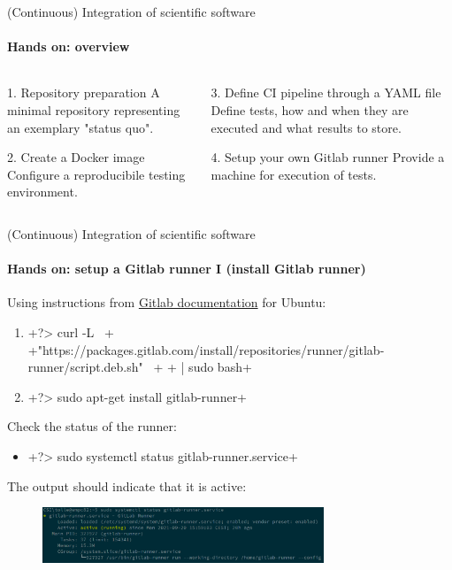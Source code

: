 \begin{frame}{(Continuous) Integration of scientific software}
    \framesubtitle{Hands on: overview}
    \begin{columns}
    \begin{column}{0.48\textwidth}
        \begin{block}{1. Repository preparation}
            A minimal repository representing an exemplary
            "status quo".
        \end{block}
        \begin{block}{2. Create a Docker image}
            Configure a reproducibile testing environment.
        \end{block}
    \end{column}

    \begin{column}{0.48\textwidth}
        \begin{block}{3. Define CI pipeline through a YAML file}
            Define tests, how and when they are executed and what
            results to store.
        \end{block}
        \begin{exampleblock}{4. Setup your own Gitlab runner}
            Provide a machine for execution of tests.
        \end{exampleblock}
    \end{column}
    \end{columns}
\end{frame}


\begin{frame}{(Continuous) Integration of scientific software}
    \framesubtitle{Hands on: setup a Gitlab runner I (install Gitlab runner)}
    Using instructions from \href{https://docs.gitlab.com/runner/install/linux-repository.html}{Gitlab documentation} for Ubuntu:
    \begin{enumerate}
        \item {}+?> curl -L \ +
              +"https://packages.gitlab.com/install/repositories/runner/gitlab-runner/script.deb.sh" \ +
              +  | sudo bash+
        \item {}+?> sudo apt-get install gitlab-runner+
    \end{enumerate}
    Check the status of the runner:
    \begin{itemize}
        \item {}+?> sudo systemctl status gitlab-runner.service+
    \end{itemize}
    The output should indicate that it is active:
    \begin{figure}
        \includegraphics[width=0.75\textwidth]{figures/gitlab-runner-active.png}
    \end{figure}
\end{frame}


